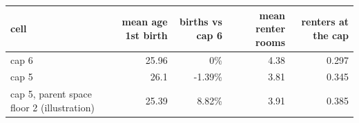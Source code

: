 \begin{tabular}{lrrrr}
\toprule
cell & mean age 1st birth & births vs cap 6 & mean renter rooms & renters at the cap \\
\midrule
cap 6 & 25.96 & 0\% & 4.38 & 0.297 \\
cap 5 & 26.1 & -1.39\% & 3.81 & 0.345 \\
cap 5, parent space floor 2 (illustration) & 25.39 & 8.82\% & 3.91 & 0.385 \\
\bottomrule
\end{tabular}
